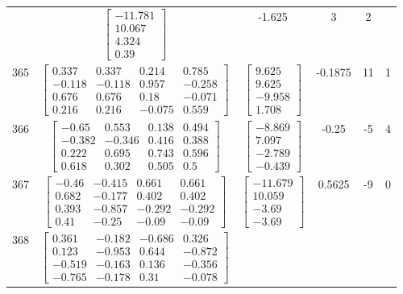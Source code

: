 \documentclass[a4paper,12pt]{article}
\begin{document}
\begin{tabular}{c c c c c c}
&
$\begin{bmatrix} -11.781 \\ 10.067 \\ 4.324 \\ 0.39 \end{bmatrix}$
&
-1.625
&
3
&
2
\\
365
&
$\begin{bmatrix} 0.337 & 0.337 & 0.214 & 0.785 \\ -0.118 & -0.118 & 0.957 & -0.258 \\ 0.676 & 0.676 & 0.18 & -0.071 \\ 0.216 & 0.216 & -0.075 & 0.559 \end{bmatrix}$
&
$\begin{bmatrix} 9.625 \\ 9.625 \\ -9.958 \\ 1.708 \end{bmatrix}$
&
-0.1875
&
11
&
1
\\
366
&
$\begin{bmatrix} -0.65 & 0.553 & 0.138 & 0.494 \\ -0.382 & -0.346 & 0.416 & 0.388 \\ 0.222 & 0.695 & 0.743 & 0.596 \\ 0.618 & 0.302 & 0.505 & 0.5 \end{bmatrix}$
&
$\begin{bmatrix} -8.869 \\ 7.097 \\ -2.789 \\ -0.439 \end{bmatrix}$
&
-0.25
&
-5
&
4
\\
367
&
$\begin{bmatrix} -0.46 & -0.415 & 0.661 & 0.661 \\ 0.682 & -0.177 & 0.402 & 0.402 \\ 0.393 & -0.857 & -0.292 & -0.292 \\ 0.41 & -0.25 & -0.09 & -0.09 \end{bmatrix}$
&
$\begin{bmatrix} -11.679 \\ 10.059 \\ -3.69 \\ -3.69 \end{bmatrix}$
&
0.5625
&
-9
&
0
\\
368
&
$\begin{bmatrix} 0.361 & -0.182 & -0.686 & 0.326 \\ 0.123 & -0.953 & 0.644 & -0.872 \\ -0.519 & -0.163 & 0.136 & -0.356 \\ -0.765 & -0.178 & 0.31 & -0.078 \end{bmatrix}$

\end{tabular}
\end{document}
